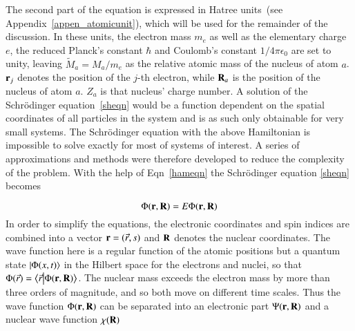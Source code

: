 The second part of the equation is expressed in Hatree units~(see Appendix~\ref{appen_atomicunit}), which will be used for the remainder of the discussion. In these units, the electron mass $m_e$ as well as the elementary charge $e$, the reduced Planck's constant $\hbar$ and Coulomb's constant $1/4\pi\epsilon_0$ are set to unity, leaving $\tilde{M}_a = M_a/m_e$ as the relative atomic mass of the nucleus of atom $a$. $\vb{r}_j$ denotes the position of the $j$-th electron, while $\vb{R}_a$ is the position of the nucleus of atom $a$. $Z_a$ is that nucleus' charge number. A solution of the Schr\"odinger equation~\eqref{sheqn} would be a function dependent on the spatial coordinates of all particles in the system and is as such only obtainable for very small systems. The Schr\"odinger equation with the above Hamiltonian is impossible to solve exactly for most of systems of interest. A series of approximations and methods were therefore developed to reduce the complexity of the problem. With the help of Eqn~\eqref{hameqn} the Schr\"odinger equation \eqref{sheqn} becomes 

\begin{equation}
 [T_e + T_N + V_{Ne}(\vb{r},\vb{R}) + V_{ee}(\vb{r}) + V_{NN}(\vb{r})]\Phi(\vb{r},\vb{R}) = E\Phi(\vb{r},\vb{R})
\end{equation}
In order to simplify the equations, the electronic coordinates and spin indices are combined into a vector $\vb{r} = (\vec{r},s)$ and $\vb{R}$ denotes the nuclear coordinates. The wave function here is a regular function of the atomic positions but a quantum state $\ket{\Phi(x,t)}$ in the Hilbert space for the electrons and nuclei, so that $\Phi(\vec{r}) = \braket{\vec{r}}{\Phi(\vb{r},\vb{R})}$. The nuclear mass exceeds the electron mass by more than three orders of magnitude, and so both move on different time scales. Thus the wave function $\Phi(\vb{r},\vb{R})$ can be separated into an electronic part $\Psi(\vb{r},\vb{R})$ and a nuclear wave function $\chi(\vb{R})$

